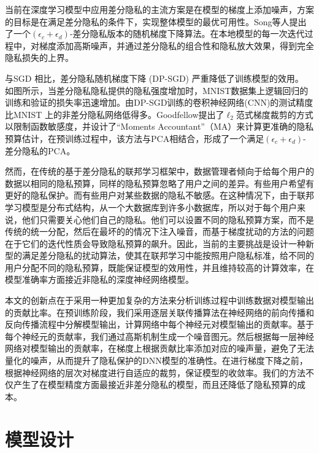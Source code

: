 当前在深度学习模型中应用差分隐私的主流方案是在模型的梯度上添加噪声，方案的目标是在满足差分隐私的条件下，实现整体模型的最优可用性。Song等人提出了一个$\left(\epsilon_{c}+\epsilon_{d}\right)$-差分隐私版本的随机梯度下降算法。在本地模型的每一次迭代过程中，对梯度添加高斯噪声，并通过差分隐私的组合性和隐私放大效果，得到完全隐私损失的上界。

与SGD 相比，差分隐私随机梯度下降 (DP-SGD) 严重降低了训练模型的效用。 如图所示，当差分隐私隐私提供的隐私强度增加时，MNIST数据集上逻辑回归的训练和验证的损失率迅速增加。由DP-SGD训练的卷积神经网络(CNN)的测试精度比MNIST 上的非差分隐私网络低得多。Goodfellow提出了$\ell_{2}$范式梯度裁剪的方式以限制函数敏感度，并设计了“Moments Accountant”（MA）来计算更准确的隐私预算估计，在预训练过程中，该方法与PCA相结合，形成了一个满足$\left(\epsilon_{c}+\epsilon_{d}\right)$-差分隐私的PCA。

然而，在传统的基于差分隐私的联邦学习框架中，数据管理者倾向于给每个用户的数据以相同的隐私预算，同样的隐私预算忽略了用户之间的差异。有些用户希望有更好的隐私保护。而有些用户对某些数据的隐私不敏感。在这种情况下，由于联邦学习模型是分布式结构，从一个大数据库到许多小数据库，所以对于每个用户来说，他们只需要关心他们自己的隐私。他们可以设置不同的隐私预算方案，而不是传统的统一分配，然后在最坏的的情况下注入噪音，而基于梯度扰动的方法的问题在于它们的迭代性质会导致隐私预算的飙升。因此，当前的主要挑战是设计一种新型的满足差分隐私的扰动算法，使其在联邦学习中能按照用户隐私标准，给不同的用户分配不同的隐私预算，既能保证模型的效用性，并且维持较高的计算效率，在模型准确率方面接近非隐私的深度神经网络模型。

本文的创新点在于采用一种更加复杂的方法来分析训练过程中训练数据对模型输出的贡献比率。在预训练阶段，我们采用逐层关联传播算法在神经网络的前向传播和反向传播流程中分解模型输出，计算网络中每个神经元对模型输出的贡献率。基于每个神经元的贡献率，我们通过高斯机制生成一个噪音图元。然后根据每一层神经网络对模型输出的贡献率，在梯度上根据贡献比率添加对应的噪声量，避免了无法量化的噪声，从而提升了隐私保护的DNN模型的准确性。在进行梯度下降之前，根据神经网络的层次对梯度进行自适应的裁剪，保证模型的收敛率。我们的方法不仅产生了在模型精度方面最接近非差分隐私的模型，而且还降低了隐私预算的成本。

\section{模型设计}

